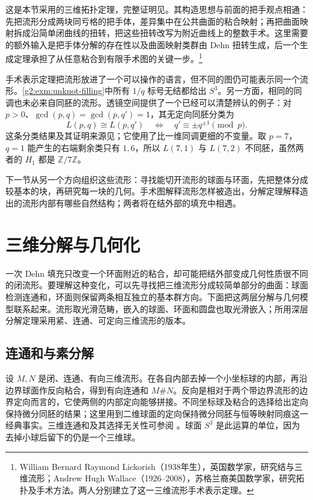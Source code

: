 这是本节采用的三维拓扑定理，完整证明见\cite[第9章I节，特别是定理1]{Rolfsen2003Knots}。其构造思想与前面的把手观点相通：先把流形分成两块同亏格的把手体，差异集中在公共曲面的粘合映射；再把曲面映射拆成沿简单闭曲线的扭转，把这些扭转改写为附近曲线上的整数手术。这里需要的额外输入是把手体分解的存在性以及曲面映射类群由 Dehn 扭转生成，后一个生成定理承担了从任意粘合到有限手术图的关键一步。\footnote{William Bernard Raymond Lickorish（1938年生），英国数学家，研究结与三维流形；Andrew Hugh Wallace（1926--2008），苏格兰裔美国数学家，研究拓扑及手术方法。两人分别建立了这一三维流形手术表示定理。}

\ProseParagraphBreak

手术表示定理把流形放进了一个可以操作的语言，但不同的图仍可能表示同一个流形。\cref{g2:exm:unknot-filling}中所有 \(1/q\) 标号无结都给出 \(S^3\)。另一方面，相同的同调也未必来自同胚的流形。透镜空间提供了一个已经可以清楚辨认的例子：对 \(p>0\)、\(\gcd(p,q)=\gcd(p,q')=1\)，其无定向同胚分类为
\[
	L(p,q)\cong L(p,q')
	\quad\Longleftrightarrow\quad
	q'\equiv\pm q^{\pm1}\pmod p.
\]
这条分类结果及其证明来源见\cite[第9章B节注7]{Rolfsen2003Knots}；它使用了比一维同调更细的不变量。取 \(p=7\)，\(q=1\) 能产生的右端剩余类只有 \(1,6\)，所以 \(L(7,1)\) 与 \(L(7,2)\) 不同胚，虽然两者的 \(H_1\) 都是 \(\mathbb Z/7\mathbb Z\)。

\ProseParagraphBreak

下一节从另一个方向组织这些流形：寻找能切开流形的球面与环面，先把整体分成较基本的块，再研究每一块的几何。手术图解释流形怎样被造出，分解定理解释造出的流形内部有哪些自然结构；两者将在结外部的填充中相遇。

\section{三维分解与几何化}
\label{g2:sec:A04}

一次 Dehn 填充只改变一个环面附近的粘合，却可能把结外部变成几何性质很不同的闭流形。要理解这种变化，可以先寻找把三维流形分成较简单部分的曲面：球面检测连通和，环面则保留两条相互独立的基本群方向。下面把这两层分解与几何模型联系起来。流形取光滑范畴，嵌入的球面、环面和圆盘也取光滑嵌入；所用深层分解定理采用紧、连通、可定向三维流形的版本。

\subsection{连通和与素分解}
\label{g2:subsec:A04:01}

设 \(M,N\) 是闭、连通、有向三维流形。在各自内部去掉一个小坐标球的内部，再沿边界球面作反向粘合，得到有向连通和 \(M\#N\)。反向是相对于两个带边界流形的边界定向而言的，它使两侧的内部定向能够拼接。不同坐标球及粘合的选择给出定向保持微分同胚的结果；这里用到二维球面的定向保持微分同胚与恒等映射同痕这一经典事实。三维连通和及其选择无关性可参阅 \cite[第1.2节]{AschenbrennerFriedlWilton2015}。球面 \(S^3\) 是此运算的单位，因为去掉小球后留下的仍是一个三维球。

